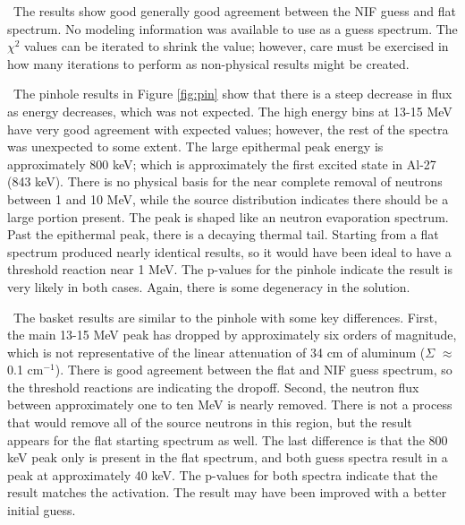 \documentclass[journal]{IEEEtran}
\begin{document}
	\ The results show good generally good agreement between the NIF guess and flat spectrum. 
No modeling information was available to use as a guess spectrum. %
The $\chi^{2}$ values can be iterated to shrink the value; however, care must be exercised in how many iterations to perform as non-physical results might be created. 
	
	\ The pinhole results in Figure \ref{fig:pin} show that there is a steep decrease in flux as energy decreases, which was not expected.  %
The high energy bins at 13-15 MeV have very good agreement with expected values; however, the rest of the spectra was unexpected to some extent. 
The large epithermal peak energy is approximately 800 keV; which is approximately the first excited state in Al-27 (843 keV).
There is no physical basis for the near complete removal of neutrons between 1 and 10 MeV, while the source distribution indicates there should be a large portion present. 
The peak is shaped like an neutron evaporation spectrum. Past the epithermal peak, there is a decaying thermal tail. 
Starting from a flat spectrum produced nearly identical results, so it would have been ideal to have a threshold reaction near 1 MeV. 
The p-values for the pinhole indicate the result is very likely in both cases. %
Again, there is some degeneracy in the solution. 
	
	\ The basket results are similar to the pinhole with some key differences. 
First, the main 13-15 MeV peak has dropped by approximately six orders of magnitude, which is not representative of the linear attenuation of 34 cm of aluminum ($\Sigma$ $\approx$ 0.1 cm$^{-1}$). 
There is good agreement between the flat and NIF guess spectrum, so the threshold reactions are indicating the dropoff. 
Second, the neutron flux between approximately one to ten MeV is nearly removed. 
There is not a process that would remove all of the source neutrons in this region, but the result appears for the flat starting spectrum as well. 
The last difference is that the 800 keV peak only is present in the flat spectrum, and both guess spectra result in a peak at approximately 40 keV. 
The p-values for both spectra indicate that the result matches the activation. 
The result may have been improved with a better initial guess. 
	
\end{document}
